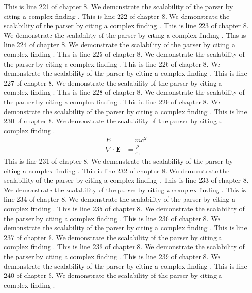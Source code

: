 This is line 221 of chapter 8. We demonstrate the scalability of the parser by citing a complex finding \cite{ref8_221}.
This is line 222 of chapter 8. We demonstrate the scalability of the parser by citing a complex finding \cite{ref8_222}.
This is line 223 of chapter 8. We demonstrate the scalability of the parser by citing a complex finding \cite{ref8_223}.
This is line 224 of chapter 8. We demonstrate the scalability of the parser by citing a complex finding \cite{ref8_224}.
This is line 225 of chapter 8. We demonstrate the scalability of the parser by citing a complex finding \cite{ref8_225}.
This is line 226 of chapter 8. We demonstrate the scalability of the parser by citing a complex finding \cite{ref8_226}.
This is line 227 of chapter 8. We demonstrate the scalability of the parser by citing a complex finding \cite{ref8_227}.
This is line 228 of chapter 8. We demonstrate the scalability of the parser by citing a complex finding \cite{ref8_228}.
This is line 229 of chapter 8. We demonstrate the scalability of the parser by citing a complex finding \cite{ref8_229}.
This is line 230 of chapter 8. We demonstrate the scalability of the parser by citing a complex finding \cite{ref8_230}.
\begin{align*}
  E &= mc^2 \\
  \nabla \cdot \mathbf{E} &= \frac{\rho}{\varepsilon_0}
\end{align*}
This is line 231 of chapter 8. We demonstrate the scalability of the parser by citing a complex finding \cite{ref8_231}.
This is line 232 of chapter 8. We demonstrate the scalability of the parser by citing a complex finding \cite{ref8_232}.
This is line 233 of chapter 8. We demonstrate the scalability of the parser by citing a complex finding \cite{ref8_233}.
This is line 234 of chapter 8. We demonstrate the scalability of the parser by citing a complex finding \cite{ref8_234}.
This is line 235 of chapter 8. We demonstrate the scalability of the parser by citing a complex finding \cite{ref8_235}.
This is line 236 of chapter 8. We demonstrate the scalability of the parser by citing a complex finding \cite{ref8_236}.
This is line 237 of chapter 8. We demonstrate the scalability of the parser by citing a complex finding \cite{ref8_237}.
This is line 238 of chapter 8. We demonstrate the scalability of the parser by citing a complex finding \cite{ref8_238}.
This is line 239 of chapter 8. We demonstrate the scalability of the parser by citing a complex finding \cite{ref8_239}.
This is line 240 of chapter 8. We demonstrate the scalability of the parser by citing a complex finding \cite{ref8_240}.
